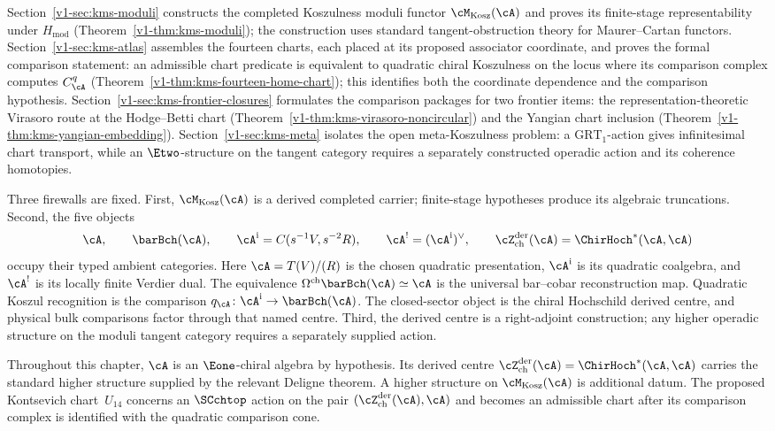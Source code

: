 Section~\ref{v1-sec:kms-moduli} constructs the completed
Koszulness moduli functor
$\cM_{\mathrm{Kosz}}(\cA)$ and proves its finite-stage
representability under $H_{\mathrm{mod}}$
(Theorem~\ref{v1-thm:kms-moduli}); the construction uses standard
tangent-obstruction theory for Maurer--Cartan functors.
Section~\ref{v1-sec:kms-atlas} assembles the fourteen charts,
each placed at its proposed associator coordinate, and proves the
formal comparison statement: an admissible chart predicate is
equivalent to quadratic chiral Koszulness on the locus where its
comparison complex computes $C^q_\cA$
(Theorem~\ref{v1-thm:kms-fourteen-home-chart}); this identifies
both the coordinate dependence and the comparison hypothesis.
Section~\ref{v1-sec:kms-frontier-closures} formulates the comparison
packages for two frontier items: the representation-theoretic
Virasoro route at the Hodge--Betti chart
(Theorem~\ref{v1-thm:kms-virasoro-noncircular})
and the Yangian chart inclusion
(Theorem~\ref{v1-thm:kms-yangian-embedding}).
Section~\ref{v1-sec:kms-meta} isolates the open meta-Koszulness
problem: a $\mathrm{GRT}_1$-action gives infinitesimal chart
transport, while an $\Etwo$-structure on the tangent category
requires a separately constructed operadic action and its coherence
homotopies.

Three firewalls are fixed. First,
$\cM_{\mathrm{Kosz}}(\cA)$ is a derived completed carrier;
finite-stage hypotheses produce its algebraic truncations. Second,
the five objects
\[
\cA,\qquad
\barBch(\cA),\qquad
\cA^{\mathrm{i}}=C(s^{-1}V,s^{-2}R),\qquad
\cA^!=(\cA^{\mathrm{i}})^\vee,\qquad
\cZ^{\mathrm{der}}_{\mathrm{ch}}(\cA)
=\ChirHoch^*(\cA,\cA)
\]
occupy their typed ambient categories.  Here
$\cA=T(V)/(R)$ is the chosen quadratic presentation,
$\cA^{\mathrm i}$ is its quadratic coalgebra, and $\cA^!$ is its
locally finite Verdier dual.  The equivalence
$\Omega^{\mathrm{ch}}\barBch(\cA)\simeq \cA$ is the universal
bar--cobar reconstruction map.  Quadratic Koszul recognition is the
comparison $q_\cA\colon\cA^{\mathrm i}\to\barBch(\cA)$.
The closed-sector object is the chiral Hochschild derived centre, and
physical bulk comparisons factor through that named centre.  Third,
the derived centre is a right-adjoint construction; any higher
operadic structure on the moduli tangent category requires a
separately supplied action.

\begin{remark}
\label{v1-rem:kms-native-vs-derived-en}
Throughout this chapter, $\cA$ is an $\Eone$-chiral algebra by
hypothesis.  Its derived centre
$\cZ^{\mathrm{der}}_{\mathrm{ch}}(\cA)=
\ChirHoch^*(\cA,\cA)$ carries the standard higher structure supplied
by the relevant Deligne theorem.  A higher structure on
$\cM_{\mathrm{Kosz}}(\cA)$ is additional datum.  The proposed
Kontsevich chart~$U_{14}$ concerns an $\SCchtop$ action on the pair
$(\cZ^{\mathrm{der}}_{\mathrm{ch}}(\cA),\cA)$ and becomes an
admissible chart after its comparison complex is identified with the
quadratic comparison cone.
\end{remark}

